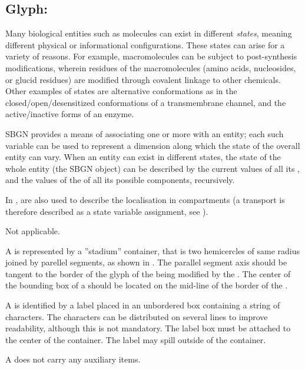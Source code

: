 \color{blue}

\subsection{Glyph: }
\label{sec:stateVariable}

Many biological entities such as molecules can exist in different \emph{states}, meaning different physical or informational configurations.  These states can arise for a variety of reasons.  For example, macromolecules can be subject to post-synthesis modifications, wherein residues of the macromolecules (amino acids, nucleosides, or glucid residues) are modified through covalent linkage to other chemicals.  Other examples of states are alternative conformations as in the closed/open/desensitized conformations of a transmembrane channel, and the active/inactive forms of an enzyme.

SBGN provides a means of associating one or more  with an entity; each such variable can be used to represent a dimension along which the state of the overall entity can vary.  When an entity can exist in different states, the state of the whole entity (\ie the SBGN object) can be described by the current values of all its , and the values of the  of all its possible components, recursively.

In \SBGNERLone,  are also used to describe the localisation in compartments (a transport is therefore described as a state variable assignment, see ).

\begin{glyphDescription}

\glyphSboTerm Not applicable.

\glyphContainer A  is represented by a ''stadium'' container, that is two hemicercles of same radius joined by parellel segments, as shown in .  The parallel segment axis should be tangent to the border of the glyph of the  being modified by the . The center of the bounding box of a  should be located on the mid-line of the border of the .

\glyphLabel A  is identified by a label placed in an unbordered box containing a string of characters.  The characters can be distributed on several lines to improve readability, although this is not mandatory.  The label box must be attached to the center of the container.  The label may spill outside of the container.

\glyphAux A  does not carry any auxiliary items.  

\end{glyphDescription}

